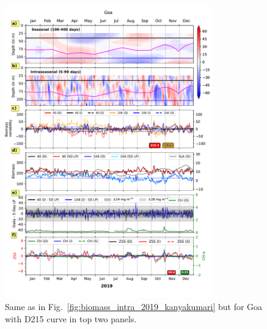 \documentclass[12pt,a4paper]{article}
\begin{document}
\begin{figure}[htbp]
	\centering
	\includegraphics[width=0.8\textwidth]{./figures/biomass_intra_2019_goa.pdf} 
	\caption{Same as in Fig.~\ref{fig:biomass_intra_2019_kanyakumari} but for Goa with D215 curve in top two panels.}		
	\label{fig:biomass_intra_2019_goa}
\end{figure}
\end{document}
